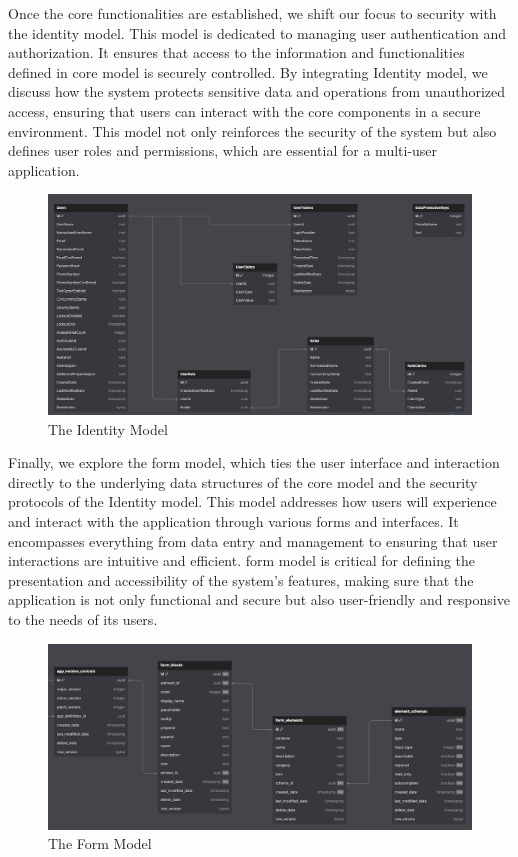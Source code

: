 Once the core functionalities are established, we shift our focus to security
with the identity model. This model is dedicated to managing user authentication
and authorization. It ensures that access to the information and functionalities
defined in core model is securely controlled. By integrating Identity model, we
discuss how the system protects sensitive data and operations from unauthorized
access, ensuring that users can interact with the core components in a secure
environment. This model not only reinforces the security of the system but also
defines user roles and permissions, which are essential for a multi-user
application. 
\begin{figure}[H]
  \centering
  \includegraphics[width=\linewidth]{Images/model_auth.png}
  \vspace{1em}
  \caption{The Identity Model}
\end{figure}

Finally, we explore the form model, which ties the user interface and
interaction directly to the underlying data structures of the core model and the
security protocols of the Identity model. This model addresses how users will
experience and interact with the application through various forms and
interfaces. It encompasses everything from data entry and management to ensuring
that user interactions are intuitive and efficient. form model is critical for
defining the presentation and accessibility of the system’s features, making
sure that the application is not only functional and secure but also
user-friendly and responsive to the needs of its users.
\begin{figure}[H]
  \centering
  \includegraphics[width=\linewidth]{Images/model_form.png}
  \vspace{1em}
  \caption{The Form Model}
\end{figure}

